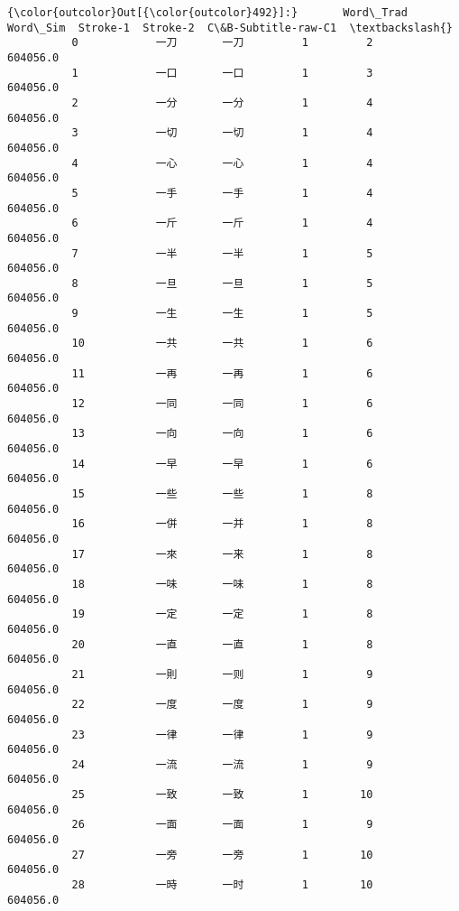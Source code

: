 \documentclass[11pt]{article}
\begin{document}
\begin{Verbatim}[commandchars=\\\{\}]
{\color{outcolor}Out[{\color{outcolor}492}]:}       Word\_Trad Word\_Sim  Stroke-1  Stroke-2  C\&B-Subtitle-raw-C1  \textbackslash{}
          0            一刀       一刀         1         2             604056.0   
          1            一口       一口         1         3             604056.0   
          2            一分       一分         1         4             604056.0   
          3            一切       一切         1         4             604056.0   
          4            一心       一心         1         4             604056.0   
          5            一手       一手         1         4             604056.0   
          6            一斤       一斤         1         4             604056.0   
          7            一半       一半         1         5             604056.0   
          8            一旦       一旦         1         5             604056.0   
          9            一生       一生         1         5             604056.0   
          10           一共       一共         1         6             604056.0   
          11           一再       一再         1         6             604056.0   
          12           一同       一同         1         6             604056.0   
          13           一向       一向         1         6             604056.0   
          14           一早       一早         1         6             604056.0   
          15           一些       一些         1         8             604056.0   
          16           一併       一并         1         8             604056.0   
          17           一來       一来         1         8             604056.0   
          18           一味       一味         1         8             604056.0   
          19           一定       一定         1         8             604056.0   
          20           一直       一直         1         8             604056.0   
          21           一則       一则         1         9             604056.0   
          22           一度       一度         1         9             604056.0   
          23           一律       一律         1         9             604056.0   
          24           一流       一流         1         9             604056.0   
          25           一致       一致         1        10             604056.0   
          26           一面       一面         1         9             604056.0   
          27           一旁       一旁         1        10             604056.0   
          28           一時       一时         1        10             604056.0   

\end{Verbatim}
\end{document}
